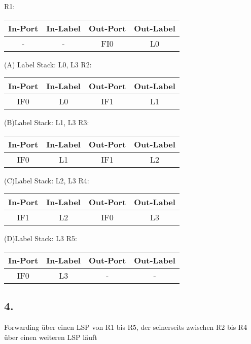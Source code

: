 \documentclass[paper=a4, fontsize=11pt]{scrartcl}
\numberwithin{equation}{section}
\numberwithin{figure}{section}
\numberwithin{table}{section}
\begin{document}
R1:\newline
\begin{tabular}{c|c|c|c}
In-Port & In-Label & Out-Port & Out-Label \\\hline
- & - & FI0 & L0\\
\end{tabular}\newline
(A) Label Stack: L0, L3\newline
R2:\newline
\begin{tabular}{c|c|c|c}
In-Port & In-Label & Out-Port & Out-Label \\\hline
IF0 & L0 & IF1 & L1\\
\end{tabular}\newline
(B)Label Stack: L1, L3\newline
R3:\newline
\begin{tabular}{c|c|c|c}
In-Port & In-Label & Out-Port & Out-Label \\\hline
IF0 & L1 & IF1 & L2\\
\end{tabular}\newline
(C)Label Stack: L2, L3\newline
R4:\newline
\begin{tabular}{c|c|c|c}
In-Port & In-Label & Out-Port & Out-Label \\\hline
IF1 & L2 & IF0 & L3\\
\end{tabular}\newline
(D)Label Stack: L3\newline
R5:\newline
\begin{tabular}{c|c|c|c}
In-Port & In-Label & Out-Port & Out-Label \\\hline
IF0 & L3 & - & -\\
\end{tabular}\newline

\subsection{4.}
Forwarding über einen LSP von R1 bis R5, der seinerseits zwischen R2 bis R4 über einen weiteren LSP läuft \\
\end{document}
